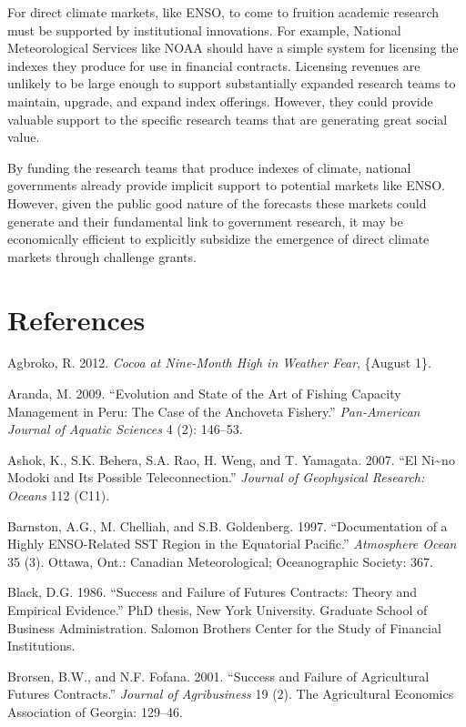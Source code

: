 \documentclass[article]{jss}
\begin{document}
For direct climate markets, like ENSO, to come to fruition academic
research must be supported by institutional innovations. For example,
National Meteorological Services like NOAA should have a simple system
for licensing the indexes they produce for use in financial contracts.
Licensing revenues are unlikely to be large enough to support
substantially expanded research teams to maintain, upgrade, and expand
index offerings. However, they could provide valuable support to the
specific research teams that are generating great social value.

By funding the research teams that produce indexes of climate, national
governments already provide implicit support to potential markets like
ENSO. However, given the public good nature of the forecasts these
markets could generate and their fundamental link to government
research, it may be economically efficient to explicitly subsidize the
emergence of direct climate markets through challenge grants.

\section*{References}\label{references}

Agbroko, R. 2012. \emph{Cocoa at Nine-Month High in Weather Fear},
\{August 1\}.

Aranda, M. 2009. ``Evolution and State of the Art of Fishing Capacity
Management in Peru: The Case of the Anchoveta Fishery.''
\emph{Pan-American Journal of Aquatic Sciences} 4 (2): 146--53.

Ashok, K., S.K. Behera, S.A. Rao, H. Weng, and T. Yamagata. 2007. ``El
Ni\textasciitilde{}no Modoki and Its Possible Teleconnection.''
\emph{Journal of Geophysical Research: Oceans} 112 (C11).

Barnston, A.G., M. Chelliah, and S.B. Goldenberg. 1997. ``Documentation
of a Highly ENSO-Related SST Region in the Equatorial Pacific.''
\emph{Atmosphere Ocean} 35 (3). Ottawa, Ont.: Canadian Meteorological;
Oceanographic Society: 367.

Black, D.G. 1986. ``Success and Failure of Futures Contracts: Theory and
Empirical Evidence.'' PhD thesis, New York University. Graduate School
of Business Administration. Salomon Brothers Center for the Study of
Financial Institutions.

Brorsen, B.W., and N.F. Fofana. 2001. ``Success and Failure of
Agricultural Futures Contracts.'' \emph{Journal of Agribusiness} 19 (2).
The Agricultural Economics Association of Georgia: 129--46.
\end{document}
